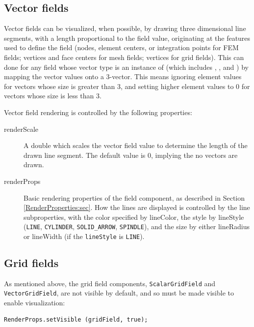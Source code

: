 \subsection{Vector fields}

Vector fields can be visualized, when possible, by drawing three
dimensional line segments, with a length proportional to the field
value, originating at the features used to define the field (nodes,
element centers, or integration points for FEM fields; vertices and
face centers for mesh fields; vertices for grid fields).  This can
done for any field whose vector type is an instance of
 (which includes
,
, and
) by mapping the vector values
onto a 3-vector. This means ignoring element values for vectors whose
size is greater than 3, and setting higher element values to 0 for
vectors whose size is less than 3.

Vector field rendering is controlled by the following properties:

\begin{description}

\item[renderScale]\mbox{}

A double which scales the vector field value to determine the length
of the drawn line segment. The default value is 0, implying the no
vectors are drawn.

\item[renderProps]\mbox{}

Basic rendering properties of the field component, as described in
Section \ref{RenderProperties:sec}. How the lines are displayed is
controlled by the line subproperties, with the color specified by {\sf
lineColor}, the style by {\sf lineStyle} ({\tt LINE}, {\tt CYLINDER},
{\tt SOLID\_ARROW}, {\tt SPINDLE}), and the size by either {\sf
lineRadius} or {\sf lineWidth} (if the {\tt lineStyle} is {\tt LINE}).

\end{description}

\subsection{Grid fields}
\label{gridFields:sec}

As mentioned above, the grid field components, {\tt ScalarGridField}
and {\tt VectorGridField}, are not visible by default, and so must be
made visible to enable visualization:
%
\begin{lstlisting}[]
  RenderProps.setVisible (gridField, true);
\end{lstlisting}
%

